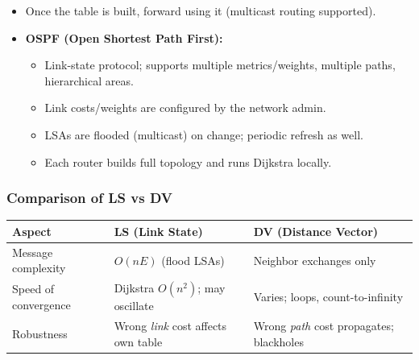 \begin{itemize}
	\item Once the table is built, forward using it (multicast routing supported).
	\item \textbf{OSPF (Open Shortest Path First):}
	\begin{itemize}
		\item Link-state protocol; supports multiple metrics/weights, multiple paths, hierarchical areas.
		\item Link costs/weights are configured by the network admin.
		\item LSAs are flooded (multicast) on change; periodic refresh as well.
		\item Each router builds full topology and runs Dijkstra locally.
	\end{itemize}
\end{itemize}

\subsubsection{Comparison of LS vs DV}
\begin{center}
\renewcommand{\arraystretch}{1.2}
\setlength{\tabcolsep}{3pt}
\begin{tabular}{p{}|p{}|p{}}
\textbf{Aspect} & \textbf{LS (Link State)} & \textbf{DV (Distance Vector)} \\
\hline
Message complexity & $O(nE)$ (flood LSAs) & Neighbor exchanges only \\
Speed of convergence & Dijkstra $O(n^2)$; may oscillate & Varies; loops, count-to-infinity \\
Robustness & Wrong \emph{link} cost affects own table & Wrong \emph{path} cost propagates; blackholes \\
\end{tabular}
\end{center}

